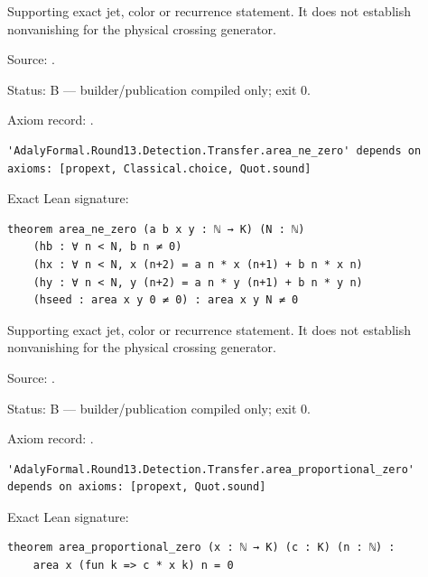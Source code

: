\begin{theorem}[bp-510]
\label{bp-510}
\leanok
Supporting exact jet, color or recurrence statement. It does not establish nonvanishing for the physical crossing generator.

\par Source: \texttt{}.
\par Status: B — builder/publication compiled only; exit 0.
\par Axiom record: \texttt{}.
\begin{verbatim}
'AdalyFormal.Round13.Detection.Transfer.area_ne_zero' depends on axioms: [propext, Classical.choice, Quot.sound]
\end{verbatim}
\par Exact Lean signature:
\begin{verbatim}
theorem area_ne_zero (a b x y : ℕ → K) (N : ℕ)
    (hb : ∀ n < N, b n ≠ 0)
    (hx : ∀ n < N, x (n+2) = a n * x (n+1) + b n * x n)
    (hy : ∀ n < N, y (n+2) = a n * y (n+1) + b n * y n)
    (hseed : area x y 0 ≠ 0) : area x y N ≠ 0
\end{verbatim}
\end{theorem}

\begin{theorem}[bp-511]
\label{bp-511}
\uses{}
\leanok
Supporting exact jet, color or recurrence statement. It does not establish nonvanishing for the physical crossing generator.

\par Source: \texttt{}.
\par Status: B — builder/publication compiled only; exit 0.
\par Axiom record: \texttt{}.
\begin{verbatim}
'AdalyFormal.Round13.Detection.Transfer.area_proportional_zero' depends on axioms: [propext, Quot.sound]
\end{verbatim}
\par Exact Lean signature:
\begin{verbatim}
theorem area_proportional_zero (x : ℕ → K) (c : K) (n : ℕ) :
    area x (fun k => c * x k) n = 0
\end{verbatim}
\end{theorem}

